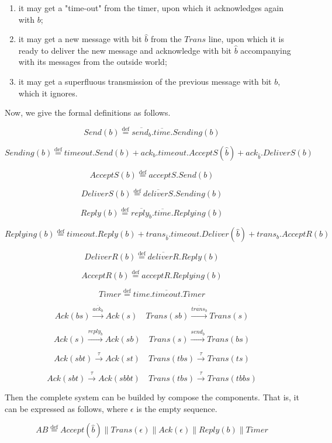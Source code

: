 \begin{enumerate}
  \item it may get a "time-out" from the timer, upon which it acknowledges again with $b$;
  \item it may get a new message with bit $\hat{b}$ from the $Trans$ line, upon which it is ready to deliver the new message and acknowledge with bit $\hat{b}$ accompanying with its messages from the outside world;
  \item it may get a superfluous transmission of the previous message with bit $b$, which it ignores.
\end{enumerate}

Now, we give the formal definitions as follows.

\[Send(b)\overset{\text{def}}{=}\overline{send_b}.\overline{time}.Sending(b)\]

\[Sending(b)\overset{\text{def}}{=}timeout.Send(b)+ack_b.timeout.AcceptS(\hat{b}) +ack_{\hat{b}}.DeliverS(b)\]

\[AcceptS(b)\overset{\text{def}}{=}acceptS.Send(b)\]

\[DeliverS(b)\overset{\text{def}}{=}\overline{deliverS}.Sending(b)\]

\[Reply(b)\overset{\text{def}}{=}\overline{reply_b}.\overline{time}.Replying(b)\]

\[Replying(b)\overset{\text{def}}{=}timeout.Reply(b)+trans_{\hat{b}}.timeout.Deliver(\hat{b}) +trans_b.AcceptR(b)\]

\[DeliverR(b)\overset{\text{def}}{=}\overline{deliverR}.Reply(b)\]

\[AcceptR(b)\overset{\text{def}}{=}acceptR.Replying(b)\]

\[Timer\overset{\text{def}}{=}time.\overline{timeout}.Timer\]

\[Ack(bs)\xrightarrow{\overline{ack_b}}Ack(s)\quad Trans(sb)\xrightarrow{\overline{trans_b}}Trans(s)\]

\[Ack(s)\xrightarrow{reply_b}Ack(sb)\quad Trans(s)\xrightarrow{send_b}Trans(bs)\]

\[Ack(sbt)\xrightarrow{\tau}Ack(st)\quad Trans(tbs)\xrightarrow{\tau}Trans(ts)\]

\[Ack(sbt)\xrightarrow{\tau}Ack(sbbt)\quad Trans(tbs)\xrightarrow{\tau}Trans(tbbs)\]

Then the complete system can be builded by compose the components. That is, it can be expressed as follows, where $\epsilon$ is the empty sequence.

$$AB\overset{\text{def}}{=}Accept(\hat{b})\parallel Trans(\epsilon)\parallel Ack(\epsilon)\parallel Reply(b)\parallel Timer$$

